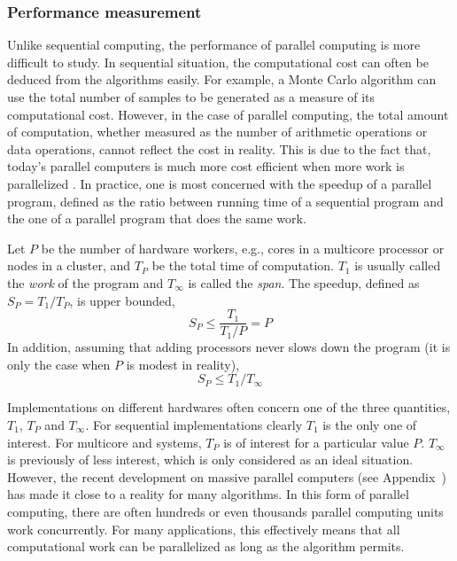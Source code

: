 \subsubsection{Performance measurement}
\label{ssub:Performance measurement}

Unlike sequential computing, the performance of parallel computing is more difficult to study. In sequential situation, the computational cost can often be deduced from the algorithms easily. For example, a Monte Carlo algorithm can use the total number of samples to be generated as a measure of its computational cost. However, in the case of parallel computing, the total amount of computation, whether measured as the number of arithmetic operations or data operations, cannot reflect the cost in reality. This is due to the fact that, today's parallel computers is much more cost efficient when more work is parallelized \cite{parallel}. In practice, one is most concerned with the speedup of a parallel program, defined as the ratio between running time of a sequential program and the one of a parallel program that does the same work.

Let $P$ be the number of hardware workers, e.g., cores in a multicore processor or nodes in a cluster, and $T_P$ be the total time of computation. $T_1$ is usually called the \emph{work} of the program and $T_{\infty}$ is called the \emph{span}. The speedup, defined as $S_P = T_1/T_P$, is upper bounded,
\begin{equation}
  S_P \le \frac{T_1}{T_1/P} = P
\end{equation}
In addition, assuming that adding processors never slows down the program (it is only the case when $P$ is modest in reality),
\begin{equation}
  S_P \le T_1/T_{\infty}
\end{equation}

Implementations on different hardwares often concern one of the three quantities, $T_1$, $T_P$ and $T_{\infty}$. For sequential implementations clearly $T_1$ is the only one of interest. For multicore and \smp systems, $T_P$ is of interest for a particular value $P$. $T_{\infty}$ is previously of less interest, which is only considered as an ideal situation. However, the recent development on massive parallel computers (see Appendix~) has made it close to a reality for many algorithms. In this form of parallel computing, there are often hundreds or even thousands parallel computing units work concurrently. For many applications, this effectively means that all computational work can be parallelized as long as the algorithm permits.

